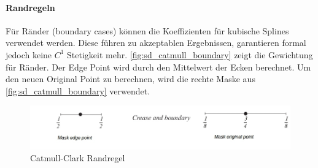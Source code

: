 \paragraph*{Randregeln}

Für Ränder (boundary cases) können die Koeffizienten für kubische Splines verwendet werden.
Diese führen zu akzeptablen Ergebnissen, garantieren formal jedoch keine \(C^1\) Stetigkeit mehr. \cite[S. 75f]{Zorin.subdivcourse}
\autoref{fig:sd_catmull_boundary} zeigt die Gewichtung für Ränder.
Der Edge Point wird durch den Mittelwert der Ecken berechnet.
Um den neuen Original Point zu berechnen, wird die rechte Maske aus \autoref{fig:sd_catmull_boundary}
verwendet.

\begin{figure}
\centering
\includegraphics[width=1.0\textwidth]{content/media/sd_catmull_boundary.jpg}
\caption{Catmull-Clark Randregel \cite[S. 76]{Zorin.subdivcourse}}
\label{fig:sd_catmull_boundary}
\end{figure}



